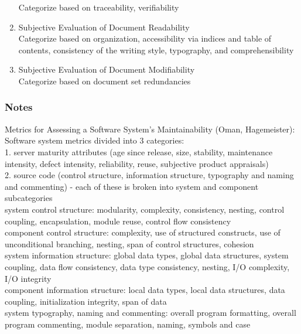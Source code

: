 \documentclass{article}
\begin{document}
\begin{enumerate}
Categorize based on traceability, verifiability
\item Subjective Evaluation of Document Readability\\

Categorize based on organization, accessibility via indices and table of contents, consistency of the writing style, typography, and comprehensibility
\item Subjective Evaluation of Document Modifiability\\

Categorize based on document set redundancies
\end{enumerate}
\subsubsection{Notes}


Metrics for Assessing a Software System's Maintainability (Oman, Hagemeister):\\
Software system metrics divided into 3 categories:\\

1. server maturity attributes (age since release, size, stability, maintenance intensity, defect intensity, reliability, reuse, subjective product appraisals)\\

2. source code (control structure, information structure, typography and naming and commenting) - each of these is broken into system and component subcategories\\

system control structure: modularity, complexity, consistency, nesting, control coupling, encapsulation, module reuse, control flow consistency\\

component control structure: complexity, use of structured constructs, use of unconditional branching, nesting, span of control structures, cohesion\\

system information structure: global data types, global data structures, system coupling, data flow consistency, data type consistency, nesting, I/O complexity, I/O integrity\\

component information structure: local data types, local data structures, data coupling, initialization integrity, span of data \\

system typography, naming and commenting: overall program formatting, overall program commenting, module separation, naming, symbols and case\\
\end{document}
